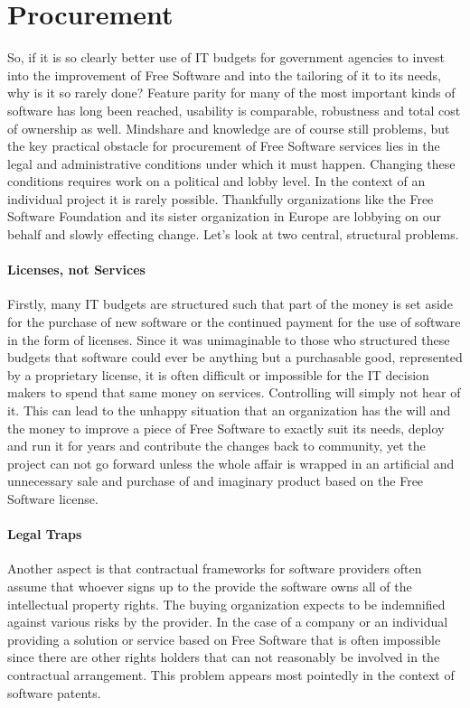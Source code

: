 \section*{Procurement}

So, if it is so clearly better use of IT budgets for government agencies to invest
into the improvement of Free Software and into the tailoring of it to its needs, why is it
so rarely done? Feature parity for many of the most important kinds of software has
long been reached, usability is comparable, robustness and total cost of ownership
as well. Mindshare and knowledge are of course still problems, but the key practical obstacle
for procurement of Free Software services lies in the legal and administrative
conditions under which it must happen. Changing these conditions requires work
on a political and lobby level. In the context of an individual project it is
rarely possible. Thankfully organizations like the Free Software Foundation and
its sister organization in Europe are lobbying on our behalf and slowly effecting
change. Let's look at two central, structural problems.

\paragraph*{Licenses, not Services}

Firstly, many IT budgets are structured such that part of the money is set aside
for the purchase of new software or the continued payment for the use of software
in the form of licenses. Since it was unimaginable to those who structured these
budgets that software could ever be anything but a purchasable good, represented
by a proprietary license, it is often difficult or impossible for the IT decision
makers to spend that same money on services. Controlling will simply not hear of it.
This can lead to the unhappy situation that an organization has the will and the
money to improve a piece of Free Software to exactly suit its needs, deploy and run
it for years and contribute the changes back to community, yet the project can not
go forward unless the whole affair is wrapped in an artificial and unnecessary sale
and purchase of and imaginary product based on the Free Software license.

\paragraph*{Legal Traps}

Another aspect is that contractual frameworks for software providers often assume
that whoever signs up to the provide the software owns all of the intellectual
property rights. The buying organization expects to be indemnified against various
risks by the provider. In the case of a company or an individual providing a solution
or service based on Free Software that is often impossible since there are other
rights holders that can not reasonably be involved in the contractual arrangement.
This problem appears most pointedly in the context of software patents.

